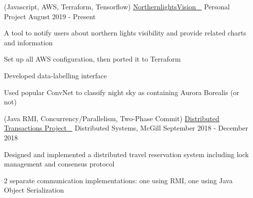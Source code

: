 


\begin{cventries}


\cventry
{(Javascript, AWS, Terraform, Tensorflow)} %
{\href{https://github.com/stumash/northern-lights-vision}{NorthernlightsVision \ \faGithubSquare\acvHeaderIconSep}} %
{Personal Project} %
{August 2019 - Present} %
{ %
\begin{cvitems}
\item {A tool to notify users about northern lights visibility and provide related charts and information}
\item {Set up all AWS configuration, then ported it to Terraform}
\item {Developed data-labelling interface}
\item {Used popular ConvNet to classify night sky as containing Aurora Borealis (or not)}
\end{cvitems}
}


\cventry
{(Java RMI, Concurrency/Parallelism, Two-Phase Commit)} %
{\href{https://github.com/stumash/DistributedSystemsProject}{Distributed Transactions Project \ \faGithubSquare\acvHeaderIconSep}} %
{Distributed Systems, McGill} %
{September 2018 - December 2018} %
{ %
\begin{cvitems}
\item {Designed and implemented a distributed travel reservation system including lock management and consensus protocol}
\item {2 separate communication implementations: one using RMI, one using Java Object Serialization}
\end{cvitems}
}


\end{cventries}
